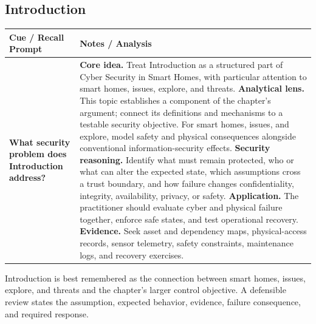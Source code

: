 \documentclass[11pt]{article}
\newcommand{\CornellHeader}{%
\rowcolor{Navy}\color{white}\bfseries Cue / Recall Prompt & \color{white}\bfseries Notes / Analysis\\\hline}
\newcommand{\CornellRow}[2]{%
\cellcolor{CueGray}\RaggedRight\textbf{#1} & \RaggedRight #2\\\hline}
\begin{document}
\subsection*{Introduction}
\begin{longtable}{>{\RaggedRight\arraybackslash}p{}|>{\RaggedRight\arraybackslash}p{}}
\CornellHeader
\CornellRow{What security problem does Introduction address?}{\textbf{Core idea.} Treat Introduction as a structured part of Cyber Security in Smart Homes, with particular attention to smart homes, issues, explore, and threats. \textbf{Analytical lens.} This topic establishes a component of the chapter's argument; connect its definitions and mechanisms to a testable security objective. For smart homes, issues, and explore, model safety and physical consequences alongside conventional information-security effects. \textbf{Security reasoning.} Identify what must remain protected, who or what can alter the expected state, which assumptions cross a trust boundary, and how failure changes confidentiality, integrity, availability, privacy, or safety. \textbf{Application.} The practitioner should evaluate cyber and physical failure together, enforce safe states, and test operational recovery. \textbf{Evidence.} Seek asset and dependency maps, physical-access records, sensor telemetry, safety constraints, maintenance logs, and recovery exercises.}
\end{longtable}
\begin{topicsummary}
Introduction is best remembered as the connection between smart homes, issues, explore, and threats and the chapter's larger control objective. A defensible review states the assumption, expected behavior, evidence, failure consequence, and required response.
\end{topicsummary}
\end{document}
